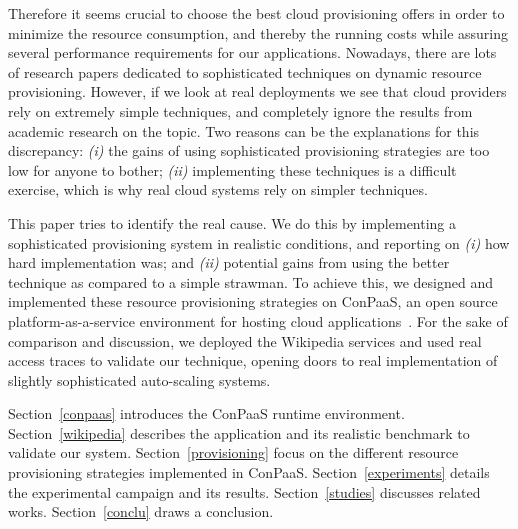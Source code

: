 Therefore it seems crucial to choose the best cloud provisioning offers in order to minimize the resource consumption, and thereby the running costs while assuring several performance requirements for our applications. Nowadays, there are lots of research papers dedicated to sophisticated techniques on dynamic resource provisioning. However, if we look at real deployments we see that cloud providers rely on extremely simple techniques, and completely ignore the results from academic research on the topic. Two reasons can be the explanations for this discrepancy: \emph{(i)} the gains of using sophisticated provisioning strategies are too low for anyone to bother; \emph{(ii)}  implementing these techniques is a difficult exercise, which is why real cloud systems rely on simpler techniques.


This paper tries to identify the real cause. We do this by implementing a sophisticated provisioning system in realistic conditions, and reporting on \emph{(i)} how hard implementation was; and \emph{(ii)} potential gains from using the better technique as compared to a simple strawman. To achieve this, we designed and implemented these resource provisioning strategies on ConPaaS, an open source platform-as-a-service environment for hosting cloud applications~\cite{conpaasIC}. For the sake of comparison and discussion, we deployed the Wikipedia services and used real access traces to validate our technique, opening doors to real implementation of slightly sophisticated auto-scaling systems.


Section~\ref{conpaas} introduces the ConPaaS runtime environment. Section~\ref{wikipedia} describes the application and its realistic benchmark to validate our system. Section~\ref{provisioning} focus on the different resource provisioning strategies implemented in ConPaaS. Section~\ref{experiments} details the experimental campaign and its results. Section~\ref{studies} discusses related works. Section~\ref{conclu} draws a conclusion.

